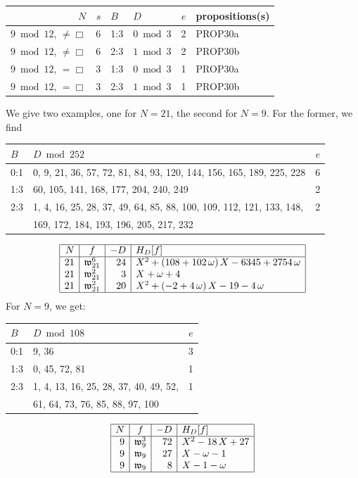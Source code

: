 \documentclass[12pt,twoside,leqno]{article}
\numberwithin{equation}{section}
\newcommand{\w}{\mathfrak w}
\begin{document}
\begin{center}
\begin{tabular}{|r|r||l|l||r||l|}\hline
$N$ & $s$
  & $B$
  & $D$
  & $e$ & propositions(s) \\ \hline
$9 \bmod 12$, $\neq\Box$ & 6 & 1:3 & $0\bmod 3$ & 2 & PROP30a \\
$9 \bmod 12$, $\neq\Box$ & 6 & 2:3 & $1\bmod 3$ & 2 & PROP30b \\
$9 \bmod 12$, $=\Box$ & 3 & 1:3 & $0\bmod 3$ & 1 & PROP30a    \\
$9 \bmod 12$, $=\Box$ & 3 & 2:3 & $1\bmod 3$ & 1 & PROP30b    \\
\hline
\end{tabular}
\end{center}
We give two examples, one for $N=21$, the second for $N=9$. For the
former, we find
\begin{center}
\begin{tabular}{|l|l|r|}\hline
$B$ & $D\bmod 252$ & $e$ \\
\hline
0:1& 0, 9, 21, 36, 57, 72, 81, 84, 93, 120, 144, 156, 165, 189, 225,
228 & 6 \\
1:3& 60, 105, 141, 168, 177, 204, 240, 249 & 2 \\
2:3& 1, 4, 16, 25, 28, 37, 49, 64, 85, 88, 100, 109, 112, 121, 133, 148,
& 2 \\
   & 169, 172, 184, 193, 196, 205, 217, 232  & \\
\hline
\end{tabular}
\end{center}
$$\begin{array}{|r|c|r|l|}\hline
N & f & -D & H_{D}[f] \\ \hline
21 & \w_{21}^{6} & 24 &
    {X}^{2}+ \left( 108+102\,\omega \right) X-6345+2754\,\omega
\\
21 & \w_{21}^{2} & 3 &
    X+\omega+4
\\
21 & \w_{21}^{2} & 20 &
    {X}^{2}+ \left( -2+4\,\omega \right) X-19-4\,\omega
\\
\hline
\end{array}$$
For $N = 9$, we get:
\begin{center}
\begin{tabular}{|l|l|r|}\hline
$B$ & $D\bmod 108$ & $e$ \\
\hline
0:1& 9, 36 & 3 \\
1:3& 0, 45, 72, 81 & 1 \\
2:3& 1, 4, 13, 16, 25, 28, 37, 40, 49, 52, & 1 \\
   & 61, 64, 73, 76, 85, 88, 97, 100 & \\
\hline
\end{tabular}
\end{center}
$$\begin{array}{|r|c|r|l|}\hline
N & f & -D & H_{D}[f] \\ \hline
9 & \w_{9}^{3} & 72 &
    {X}^{2}-18\,X+27
\\
9 & \w_{9} & 27 &
    X-\omega-1
\\
9 & \w_{9} & 8 &
    X-1-\omega
\\
\hline
\end{array}$$
\end{document}
